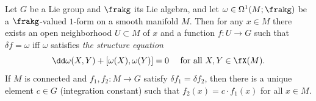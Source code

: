 \begin{thm}\label{thm 6.1 Sharpe fundamental local}
    Let $G$ be a Lie group and $\frakg$ its Lie algebra, and let $\omega\in\Omega^1(M;\frakg)$ be a $\frakg$-valued $1$-form on a smooth manifold $M$. Then for any $x\in M$ there exists an open neighborhood $U\subset M$ of $x$ and a function $f:U\to G$ such that $\delta f=\omega$ iff $\omega$ satisfies \emph{the structure equation}
    \[\dd \omega(X,Y)+[\omega(X),\omega(Y)]=0\quad \text{ for all } X,Y\in\fX(M).\]
    If $M$ is connected and $f_1,f_2:M\to G$ satisfy $\delta f_1=\delta f_2$, then there is a unique element $c\in G$ (integration constant) such that $f_2(x)=c\cdot f_1(x)$ for all $x\in M$.
\end{thm}
